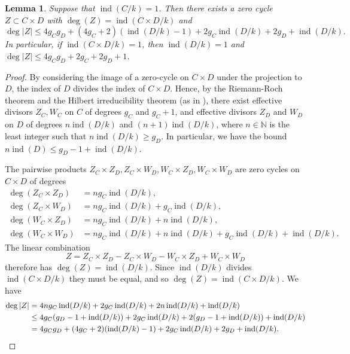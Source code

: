 \documentclass[a4paper,11pt]{amsart}
\theoremstyle{plain}
\newtheorem{lemma}[thm]{Lemma}
\theoremstyle{remark}
\newcommand{\nn}{\mathbb{N}}
\newcommand{\ind}{\operatorname{ind}}
\begin{document}
\begin{lemma}\label{lem:bound_eff_index_1}
    Suppose that \(\ind(C/k) = 1\).  Then there exists a zero cycle \(Z \subset C \times D\) with \(\deg(Z) = \ind(C \times D/k)\) and 
    \[\deg |Z|\leq 4g_Cg_D + (4g_C + 2) (\ind(D/k)-1) + 2g_C \ind(D/k) + 2g_D  + \ind(D/k).\]
    In particular, if \(\ind(C \times D/k)=1\), then \(\ind(D/k) = 1\) and \(\deg|Z|\leq 4g_Cg_D + 2g_C + 2g_D + 1\).
\end{lemma}
\begin{proof}
    By considering the image of a zero-cycle on \(C \times D\) under the projection to \(D\),
    the index of \(D\) divides the index of \(C \times D\).  Hence, by the Riemann-Roch theorem and the Hilbert irreducibility theorem (as in \cite[Proposition 5.1.1]{VV}), there exist effective divisors \(Z_C, W_C\) on \(C\) of degrees \(g_C\) and \(g_C  + 1\), and effective divisors \(Z_D\) and \(W_D\) on \(D\) of degrees \(n\ind(D/k)\) and \((n+1)\ind(D/k)\), where \(n \in \nn\) is the least integer such that \(n \ind (D/k) \geq g_D\).  In particular, we have the bound \(n \ind (D) \leq g_D -1 + \ind(D/k)\). 

    The pairwise products \(Z_C \times Z_D, Z_C \times W_D, W_C \times Z_D, W_C \times W_D\) are zero cycles on \(C \times D\) of degrees 
    \begin{align*}
        \deg (Z_C \times Z_D) &= n g_C \ind(D/k), \\
        \deg (Z_C \times W_D) &= n g_C \ind(D/k) + g_C \ind(D/k), \\
        \deg (W_C \times Z_D) &= n g_C \ind(D/k) + n \ind(D/k), \\
        \deg (W_C \times W_D) &= n g_C \ind(D/k) + n \ind(D/k) + g_C \ind(D/k) + \ind(D/k).
    \end{align*} 
    The linear combination
    \[Z = Z_C \times Z_D - Z_C \times W_D - W_C \times Z_D + W_C \times W_D\] 
    therefore has \(\deg(Z) = \ind(D/k)\).  Since \(\ind(D/k)\) divides \(\ind(C \times D/k)\) they must be equal, and so \(\deg(Z) = \ind(C \times D/k)\).
    We have 
    \begin{align*}
        \deg |Z| &= 4n g_C \ind(D/k) + 2g_C \ind(D/k) + 2n \ind(D/k) + \ind(D/k) \\
        & \leq 4g_C(g_D -1 + \ind(D/k)) + 2g_C \ind(D/k) + 2(g_D -1 + \ind(D/k)) + \ind(D/k) \\
        &= 4g_Cg_D + (4g_C + 2) (\ind(D/k)-1) + 2g_C \ind(D/k) + 2g_D  + \ind(D/k). \qedhere
    \end{align*}
\end{proof}
\end{document}

